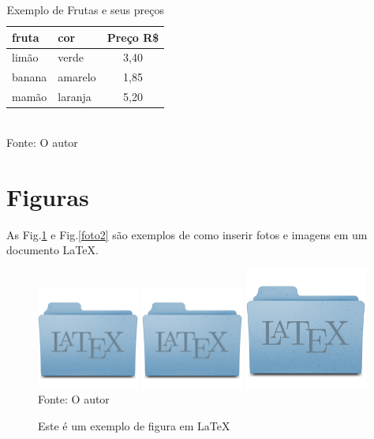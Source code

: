 \begin{table}[H]     %
	\centering
	\caption{Exemplo de Frutas e seus pre\c{c}os} 	\label{tabela2}
	\begin{tabular}{|l|l|c|}
        \hline
		fruta & cor  & Pre\c{c}o R\$ \\        %
		\hline
		lim\~{a}o & verde &  3,40 \\
		banana& amarelo & 1,85 \\
		mam\~{a}o & laranja & 5,20\\
     	\hline
	\end{tabular}\\
    {\small Fonte: O autor}
\end{table}



\section{Figuras}
As Fig.\ref{foto1}  e Fig.\ref{foto2} s\~{a}o exemplos de como inserir fotos e imagens em um documento \LaTeX.
\begin{figure}[H]
	\begin{center}
		\caption{Este \'{e} um exemplo de figura em \LaTeX}
		\label{foto1}
		\includegraphics[angle=90,width=0.3\textwidth]{latex.png}
		\includegraphics[angle=45,width=0.3\textwidth]{latex.png}	
		\includegraphics[width=4cm]{latex.png}	\\		
        {\small Fonte: O autor}
	\end{center}
\end{figure} 